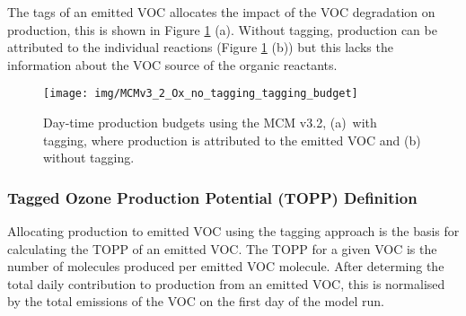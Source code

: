 The tags of an emitted VOC allocates the impact of the VOC degradation on  production, this is shown in Figure \ref{f:Ox_budget} (a).
Without tagging,  production can be attributed to the individual reactions (Figure \ref{f:Ox_budget} (b)) but this lacks the information about the VOC source of the organic reactants.

\begin{figure}
    \centering
    \texttt{[image: img/MCMv3\_2\_Ox\_no\_tagging\_tagging\_budget]}
    \vspace{1mm}
    \caption{Day-time  production budgets using the MCM v3.2, \mbox{(a) with} tagging, where  production is attributed to the emitted VOC and (b) without tagging.}
    \vspace{-4mm}
    \label{f:Ox_budget}
\end{figure} 

\subsubsection{Tagged Ozone Production Potential (TOPP) Definition} %

Allocating  production to emitted VOC using the tagging approach is the basis for calculating the TOPP of an emitted VOC.
The TOPP for a given VOC is the number of  molecules produced per emitted VOC molecule.  
After determing the total daily contribution to  production from an emitted VOC, this is normalised by the total emissions of the VOC on the first day of the model run.

